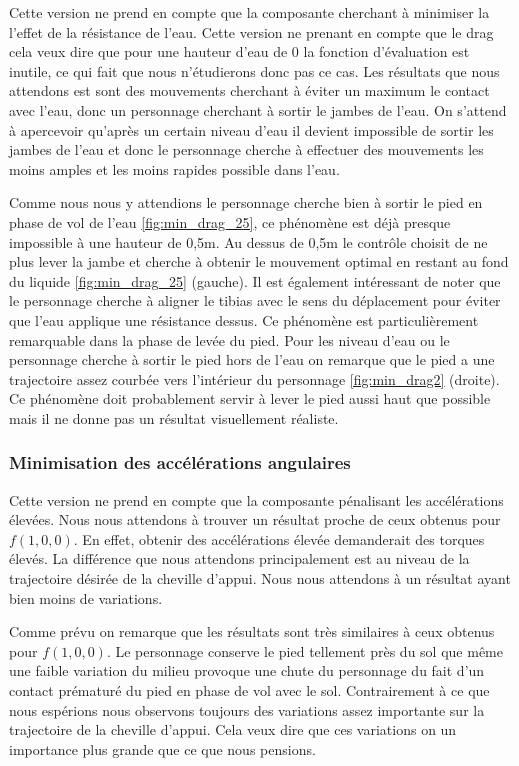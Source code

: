 \documentclass[runningheads,a4paper]{llncs}
\begin{document}
Cette version ne prend en compte que la composante cherchant à minimiser la l'effet de la résistance de l'eau. Cette version ne prenant en compte que le drag cela veux dire que pour une hauteur d'eau de 0 la fonction d'évaluation est inutile, ce qui fait que nous n'étudierons donc pas ce cas. Les résultats que nous attendons est sont des mouvements cherchant à éviter un maximum le contact avec l'eau, donc un personnage cherchant à sortir le jambes de l'eau. On s'attend à apercevoir qu'après un certain niveau d'eau il devient impossible de sortir les jambes de l'eau et donc le personnage cherche à effectuer des mouvements les moins amples et les moins rapides possible dans l'eau. 
 
Comme nous nous y attendions le personnage cherche bien à sortir le pied en phase de vol de l'eau \ref{fig:min_drag_25}, ce phénomène est déjà presque impossible à une hauteur de 0,5m. Au dessus de 0,5m le contrôle choisit de ne plus lever la jambe et cherche à obtenir le mouvement optimal en restant au fond du liquide  \ref{fig:min_drag_25} (gauche). Il est également intéressant de noter que le personnage cherche à aligner le tibias avec le sens du déplacement pour éviter que l'eau applique une résistance dessus. Ce phénomène est particulièrement remarquable dans la phase de levée du pied. Pour les niveau d'eau ou le personnage cherche à sortir le pied hors de l'eau on remarque que le pied a une trajectoire assez courbée vers l'intérieur du personnage  \ref{fig:min_drag2} (droite). Ce phénomène doit probablement servir à lever le pied aussi haut que possible mais il ne donne pas un résultat visuellement réaliste.  

\subsubsection{Minimisation des accélérations angulaires}
Cette version ne prend en compte que la composante pénalisant les accélérations élevées. Nous nous attendons à trouver un résultat proche de ceux obtenus pour $f(1,0,0)$. En effet, obtenir des accélérations élevée demanderait des torques élevés. La différence que nous attendons principalement est au niveau de la trajectoire désirée de la cheville d'appui. Nous nous attendons à un résultat ayant bien moins de variations.

Comme prévu on remarque que les résultats sont très similaires à ceux obtenus pour $f(1,0,0)$. Le personnage conserve le pied tellement près du sol que même une faible variation du milieu provoque une chute du personnage du fait d'un contact prématuré du pied en phase de vol avec le sol. Contrairement à ce que nous espérions nous observons toujours des variations assez importante sur la trajectoire de la cheville d'appui. Cela veux dire que ces variations on un importance plus grande que ce que nous pensions.
\end{document}
